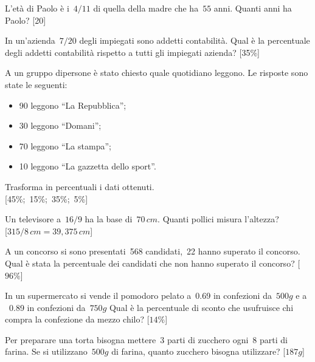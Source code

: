 \begin{multicols}{2}

\begin{esercizio}
L'età di Paolo è i~\(4/11\) di quella della madre che
ha~\(55\) anni. 
Quanti anni ha Paolo? \hfill [20]
\end{esercizio}

\begin{esercizio}
In un'azienda~\(7/20\) degli impiegati sono addetti contabilità.
Qual è la percentuale degli addetti contabilità
rispetto a tutti gli impiegati azienda? \hfill [35\%]
\end{esercizio}

\begin{esercizio}
A un gruppo dipersone è stato chiesto quale quotidiano
leggono. Le risposte sono state le seguenti:
\begin{itemize}[nosep]
\item 90 leggono ``La Repubblica'';
\item 30 leggono ``Domani'';
\item 70 leggono ``La stampa'';
\item 10 leggono ``La gazzetta dello sport''.
\end{itemize}
Trasforma in percentuali i dati ottenuti.\\
\phantom{.}\hfill [45\%;~15\%;~35\%;~5\%]
\end{esercizio}

\begin{esercizio}
Un televisore a~\(16/9\) ha la base di~\(70\,cm\).
Quanti pollici misura l'altezza?\\
\phantom{.}\hfill [\(315/8\,cm=39,375\,cm\)]
\end{esercizio}

\begin{esercizio}
A un concorso si sono presentati~568 candidati,~22 hanno superato il
concorso. Qual è stata la percentuale dei candidati che non hanno
superato il concorso?
\phantom{.}\hfill [\(96\%\)]
\end{esercizio}

\begin{esercizio}
In un supermercato si vende il pomodoro pelato a \officialeuro\,0.69 in
confezioni da~\(500\unit{g}\) e a \officialeuro~0.89 in confezioni
da~\(750\unit{g}\) 
Qual è la percentuale di sconto che usufruisce chi compra la confezione da 
mezzo chilo?
\phantom{.}\hfill [\(14\%\)]
\end{esercizio}

\begin{esercizio}
Per preparare una torta bisogna mettere~3 parti di zucchero ogni~8
parti di farina. Se si utilizzano~\(500\unit{g}\) di farina,
quanto zucchero bisogna utilizzare?
\hfill [\(187\unit{g}\)]
\end{esercizio}


\end{multicols}
